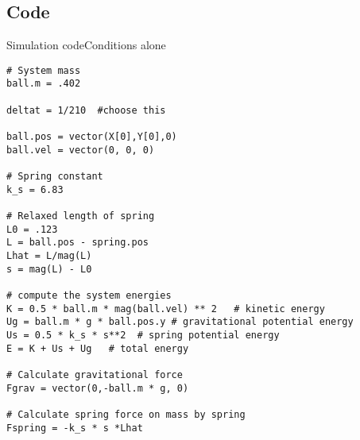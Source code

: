 




\subsection{Code}

\begin{frame}[fragile]{Simulation code}{Conditions alone}
\begin{verbatim}
# System mass
ball.m = .402

deltat = 1/210  #choose this

ball.pos = vector(X[0],Y[0],0)
ball.vel = vector(0, 0, 0)

# Spring constant
k_s = 6.83

# Relaxed length of spring
L0 = .123
L = ball.pos - spring.pos
Lhat = L/mag(L)
s = mag(L) - L0  

# compute the system energies 
K = 0.5 * ball.m * mag(ball.vel) ** 2   # kinetic energy 
Ug = ball.m * g * ball.pos.y # gravitational potential energy 
Us = 0.5 * k_s * s**2  # spring potential energy 
E = K + Us + Ug   # total energy

# Calculate gravitational force
Fgrav = vector(0,-ball.m * g, 0)

# Calculate spring force on mass by spring
Fspring = -k_s * s *Lhat
\end{verbatim}
\end{frame}

